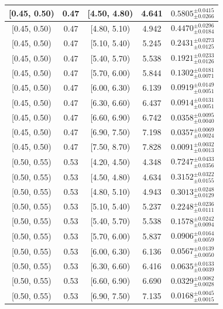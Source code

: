 \begin{longtable}{|c|c|c|c|c|}
\hline
[0.45, 0.50) & 0.47 & [4.50, 4.80) & 4.641 & $0.5805^{ \pm 0.0415 }_{ \pm 0.0266 }$ \\ 
\hline
[0.45, 0.50) & 0.47 & [4.80, 5.10) & 4.942 & $0.4470^{ \pm 0.0296 }_{ \pm 0.0184 }$ \\ 
\hline
[0.45, 0.50) & 0.47 & [5.10, 5.40) & 5.245 & $0.2431^{ \pm 0.0273 }_{ \pm 0.0125 }$ \\ 
\hline
[0.45, 0.50) & 0.47 & [5.40, 5.70) & 5.538 & $0.1921^{ \pm 0.0233 }_{ \pm 0.0126 }$ \\ 
\hline
[0.45, 0.50) & 0.47 & [5.70, 6.00) & 5.844 & $0.1302^{ \pm 0.0181 }_{ \pm 0.0071 }$ \\ 
\hline
[0.45, 0.50) & 0.47 & [6.00, 6.30) & 6.139 & $0.0919^{ \pm 0.0149 }_{ \pm 0.0051 }$ \\ 
\hline
[0.45, 0.50) & 0.47 & [6.30, 6.60) & 6.437 & $0.0914^{ \pm 0.0131 }_{ \pm 0.0051 }$ \\ 
\hline
[0.45, 0.50) & 0.47 & [6.60, 6.90) & 6.742 & $0.0358^{ \pm 0.0095 }_{ \pm 0.0040 }$ \\ 
\hline
[0.45, 0.50) & 0.47 & [6.90, 7.50) & 7.198 & $0.0357^{ \pm 0.0069 }_{ \pm 0.0024 }$ \\ 
\hline
[0.45, 0.50) & 0.47 & [7.50, 8.70) & 7.828 & $0.0091^{ \pm 0.0032 }_{ \pm 0.0013 }$ \\ 
\hline
[0.50, 0.55) & 0.53 & [4.20, 4.50) & 4.348 & $0.7247^{ \pm 0.0433 }_{ \pm 0.0356 }$ \\ 
\hline
[0.50, 0.55) & 0.53 & [4.50, 4.80) & 4.634 & $0.3152^{ \pm 0.0322 }_{ \pm 0.0155 }$ \\ 
\hline
[0.50, 0.55) & 0.53 & [4.80, 5.10) & 4.943 & $0.3013^{ \pm 0.0248 }_{ \pm 0.0129 }$ \\ 
\hline
[0.50, 0.55) & 0.53 & [5.10, 5.40) & 5.237 & $0.2248^{ \pm 0.0236 }_{ \pm 0.0111 }$ \\ 
\hline
[0.50, 0.55) & 0.53 & [5.40, 5.70) & 5.538 & $0.1578^{ \pm 0.0242 }_{ \pm 0.0094 }$ \\ 
\hline
[0.50, 0.55) & 0.53 & [5.70, 6.00) & 5.837 & $0.0906^{ \pm 0.0164 }_{ \pm 0.0059 }$ \\ 
\hline
[0.50, 0.55) & 0.53 & [6.00, 6.30) & 6.136 & $0.0567^{ \pm 0.0139 }_{ \pm 0.0050 }$ \\ 
\hline
[0.50, 0.55) & 0.53 & [6.30, 6.60) & 6.416 & $0.0635^{ \pm 0.0133 }_{ \pm 0.0039 }$ \\ 
\hline
[0.50, 0.55) & 0.53 & [6.60, 6.90) & 6.690 & $0.0329^{ \pm 0.0082 }_{ \pm 0.0028 }$ \\ 
\hline
[0.50, 0.55) & 0.53 & [6.90, 7.50) & 7.135 & $0.0168^{ \pm 0.0045 }_{ \pm 0.0015 }$ \\ 

\end{longtable}
